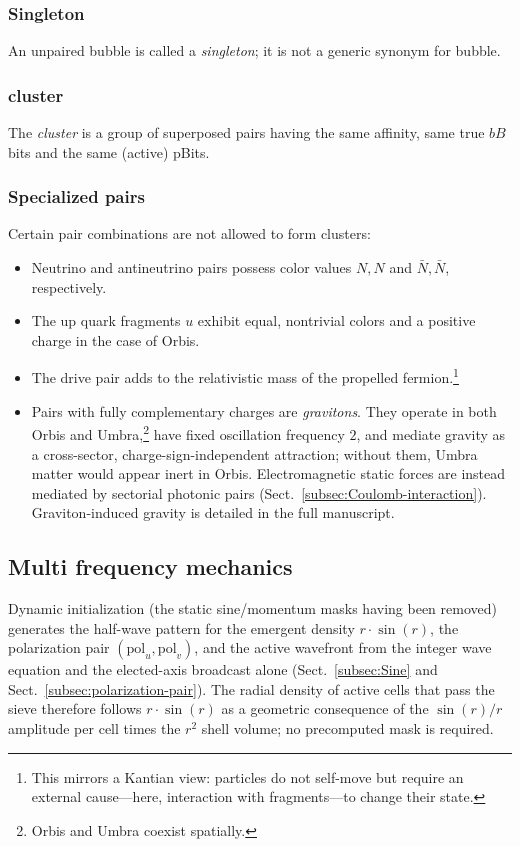 \documentclass[a4paper]{article}
\begin{document}
\subsubsection{Singleton}
An unpaired bubble is called a \textit{singleton}; it is not a generic synonym for bubble.
\subsubsection{cluster}
The \textit{cluster} is a group of superposed pairs having the same affinity, same true $bB$ bits and the same (active) pBits.
\subsubsection{Specialized pairs} \label{subsec:specialized-pairs}
Certain pair combinations are not allowed to form clusters:
\begin{itemize}
\item Neutrino and antineutrino pairs possess color values $N, N$ and $\bar{N}, \bar{N}$, respectively.
\item The up quark fragments $u$ exhibit equal, nontrivial colors and a positive charge in the case of Orbis.
\item The drive pair adds to the relativistic mass of the propelled fermion.\footnote{This mirrors a Kantian view: particles do not self-move but require an external cause---here, interaction with fragments---to change their state.}
\item Pairs with fully complementary charges are \emph{gravitons}. They operate in both Orbis and Umbra,\footnote{Orbis and Umbra coexist spatially.} have fixed oscillation frequency $2$, and mediate gravity as a cross-sector, charge-sign-independent attraction; without them, Umbra matter would appear inert in Orbis. Electromagnetic static forces are instead mediated by sectorial photonic pairs (Sect.~\ref{subsec:Coulomb-interaction}). Graviton-induced gravity is detailed in the full manuscript.
\end{itemize}

\subsection{Multi frequency mechanics}\label{subsec:multi-frequency}
Dynamic initialization (the static sine/momentum masks having been removed) generates the half-wave pattern for the emergent density $r\cdot\sin(r)$, the polarization pair $(\mathrm{pol}_u,\mathrm{pol}_v)$, and the active wavefront from the integer wave equation and the elected-axis broadcast alone (Sect.~\ref{subsec:Sine} and Sect.~\ref{subsec:polarization-pair}). The radial density of active cells that pass the sieve therefore follows $r\cdot\sin(r)$ as a geometric consequence of the $\sin(r)/r$ amplitude per cell times the $r^{2}$ shell volume; no precomputed mask is required.
\end{document}
